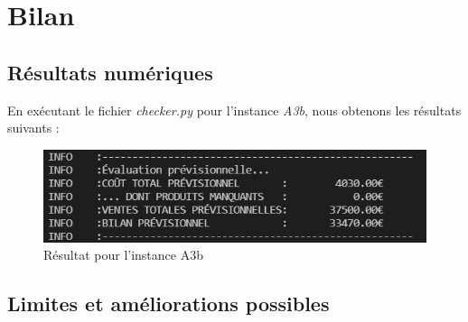 \documentclass[12pt, a4paper]{article}
\begin{document}

\section{Bilan}
\subsection{Résultats numériques}
En exécutant le fichier \emph{checker.py} pour l'instance \emph{A3b}, nous obtenons les résultats suivants :

\begin{figure}[h] %
    \centering
    \includegraphics[width=1\textwidth]{checker} %
    \caption{Résultat pour l'instance A3b} %
    \label{fig:checker} %
\end{figure}


\subsection{Limites et améliorations possibles}

\end{document}

